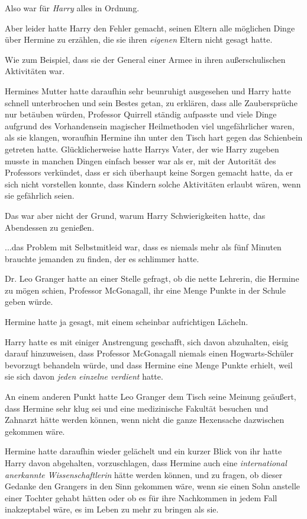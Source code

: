{Also war für \emph{Harry} alles in Ordnung.

Aber leider hatte Harry den Fehler gemacht, seinen Eltern alle möglichen Dinge über Hermine zu erzählen, die sie ihren \emph{eigenen} Eltern nicht gesagt hatte.

Wie zum Beispiel, dass sie der General einer Armee in ihren außerschulischen Aktivitäten war.

Hermines Mutter hatte daraufhin sehr beunruhigt ausgesehen und Harry hatte schnell unterbrochen und sein Bestes getan, zu erklären, dass alle Zaubersprüche nur betäuben würden, Professor Quirrell ständig aufpasste und viele Dinge aufgrund des Vorhandensein magischer Heilmethoden viel ungefährlicher waren, als sie klangen, woraufhin Hermine ihn unter den Tisch hart gegen das Schienbein getreten hatte. Glücklicherweise hatte Harrys Vater, der wie Harry zugeben musste in manchen Dingen einfach besser war als er, mit der Autorität des Professors verkündet, dass er sich überhaupt keine Sorgen gemacht hatte, da er sich nicht vorstellen konnte, dass Kindern solche Aktivitäten erlaubt wären, wenn sie gefährlich seien.

Das war aber nicht der Grund, warum Harry Schwierigkeiten hatte, das Abendessen zu genießen.

...das Problem mit Selbstmitleid war, dass es niemals mehr als fünf Minuten brauchte jemanden zu finden, der es schlimmer hatte.

Dr. Leo Granger hatte an einer Stelle gefragt, ob die nette Lehrerin, die Hermine zu mögen schien, Professor McGonagall, ihr eine Menge Punkte in der Schule geben würde.

Hermine hatte ja gesagt, mit einem scheinbar aufrichtigen Lächeln.

Harry hatte es mit einiger Anstrengung geschafft, sich davon abzuhalten, eisig darauf hinzuweisen, dass Professor McGonagall niemals einen Hogwarts-Schüler bevorzugt behandeln würde, und dass Hermine eine Menge Punkte erhielt, weil sie sich davon \emph{jeden einzelne verdient} hatte.

An einem anderen Punkt hatte Leo Granger dem Tisch seine Meinung geäußert, dass Hermine sehr klug sei und eine medizinische Fakultät besuchen und Zahnarzt hätte werden können, wenn nicht die ganze Hexensache dazwischen gekommen wäre.

Hermine hatte daraufhin wieder gelächelt und ein kurzer Blick von ihr hatte Harry davon abgehalten, vorzuschlagen, dass Hermine auch eine \emph{international anerkannte Wissenschaftlerin} hätte werden können, und zu fragen, ob dieser Gedanke den Grangers in den Sinn gekommen wäre, wenn sie einen Sohn anstelle einer Tochter gehabt hätten oder ob es für ihre Nachkommen in jedem Fall inakzeptabel wäre, es im Leben zu mehr zu bringen als sie.

}
